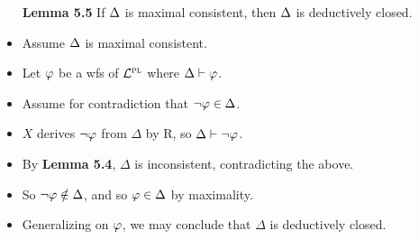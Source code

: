 \documentclass[a4paper, 11pt]{article} %
\begin{document}
\begin{itemize}
  \item[\bf Lemma 5.5] If $\Delta$ is maximal consistent, then $\Delta$ is deductively closed.
    \item Assume $\Delta$ is maximal consistent.
    \item Let $\varphi$ be a wfs of $\mathcal{L}^{\textsc{pl}}$ where $\Delta\vdash\varphi$.
    \item Assume for contradiction that $\neg\varphi \in \Delta$.
    \item $X$ derives $\neg\varphi$ from $\Delta$ by R, so $\Delta \vdash \neg\varphi$.
    \item By \textbf{Lemma 5.4}, $\Delta$ is inconsistent, contradicting the above.
    \item So $\neg\varphi\notin\Delta$, and so $\varphi \in \Delta$ by maximality. 
    \item Generalizing on $\varphi$, we may conclude that $\Delta$ is deductively closed. 
\end{itemize}
\end{document}
